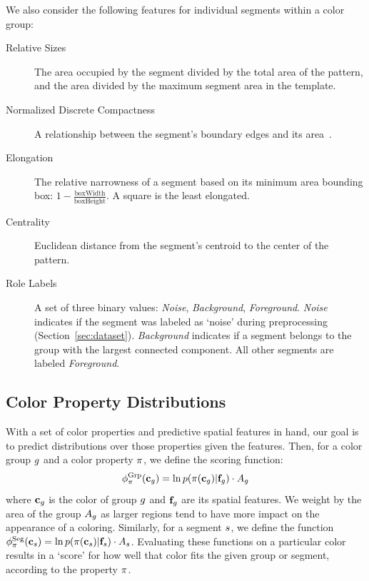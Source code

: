 We also consider the following features for individual segments within a color group:
\begin{description}
	\item[Relative Sizes] The area occupied by the segment divided by the total area of the pattern, and the area divided by the maximum segment area in the template.
  \item[Normalized Discrete Compactness] A relationship between the segment's boundary edges and its area~\cite{NormalizedDiscreteCompactness}.
  \item[Elongation] The relative narrowness of a segment based on its minimum area bounding box: $1-\frac{\textrm{boxWidth}}{\textrm{boxHeight}}$. A square is the least elongated.
  \item[Centrality] Euclidean distance from the segment's centroid to the center of the pattern.
  \item[Role Labels] A set of three binary values: {\emph{Noise}, \emph{Background}, \emph{Foreground}}. \emph{Noise} indicates if the segment was labeled as `noise' during preprocessing (Section~\ref{sec:dataset}). \emph{Background} indicates if a segment belongs to the group with the largest connected component. All other segments are labeled \emph{Foreground}.
\end{description}

\subsection{Color Property Distributions}
\label{sec:unaryDistribs}

With a set of color properties and predictive spatial features in hand, our goal is to predict distributions over those properties given the features. Then, for a color group $g$ and a color property $\pi$, we define the scoring function:
\begin{equation*}
\phi^{\textrm{Grp}}_\pi(\mathbf{c}_g) =  \ln p( \pi( \mathbf{c}_g ) | \mathbf{f}_g ) \cdot A_g
\end{equation*}
where $\mathbf{c}_g$ is the color of group $g$ and $\mathbf{f}_g$ are its spatial features. We weight by the area of the group $A_g$ as larger regions tend to have more impact on the appearance of a coloring. Similarly, for a segment $s$, we define the function $\phi^{\textrm{Seg}}_\pi(\mathbf{c}_s) = \ln p( \pi( \mathbf{c}_s ) | \mathbf{f}_s) \cdot A_s$. Evaluating these functions on a particular color results in a `score' for how well that color fits the given group or segment, according to the property $\pi$.

